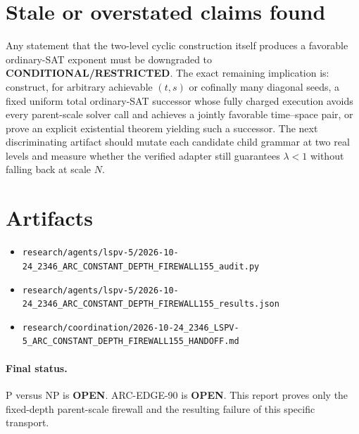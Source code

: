 \documentclass[11pt]{article}
\newcommand{\OPEN}{\textbf{OPEN}}
\begin{document}
\section*{Stale or overstated claims found}
Any statement that the two-level cyclic construction itself produces a
favorable ordinary-SAT exponent must be downgraded to
\textbf{CONDITIONAL/RESTRICTED}.  The exact remaining implication is:
construct, for arbitrary achievable $(t,s)$ or cofinally many diagonal seeds, a
fixed uniform total ordinary-SAT successor whose fully charged execution avoids
every parent-scale solver call and achieves a jointly favorable time--space
pair, or prove an explicit existential theorem yielding such a successor.
The next discriminating artifact should mutate each candidate child grammar at
two real levels and measure whether the verified adapter still guarantees
$\lambda<1$ without falling back at scale $N$.

\section*{Artifacts}
\begin{itemize}
\item \texttt{research/agents/lspv-5/2026-10-24\_2346\_ARC\_CONSTANT\_DEPTH\_FIREWALL155\_audit.py}
\item \texttt{research/agents/lspv-5/2026-10-24\_2346\_ARC\_CONSTANT\_DEPTH\_FIREWALL155\_results.json}
\item \texttt{research/coordination/2026-10-24\_2346\_LSPV-5\_ARC\_CONSTANT\_DEPTH\_FIREWALL155\_HANDOFF.md}
\end{itemize}

\paragraph{Final status.}
P versus NP is \OPEN.  ARC-EDGE-90 is \OPEN.  This report proves only the
fixed-depth parent-scale firewall and the resulting failure of this specific
transport.
\end{document}
